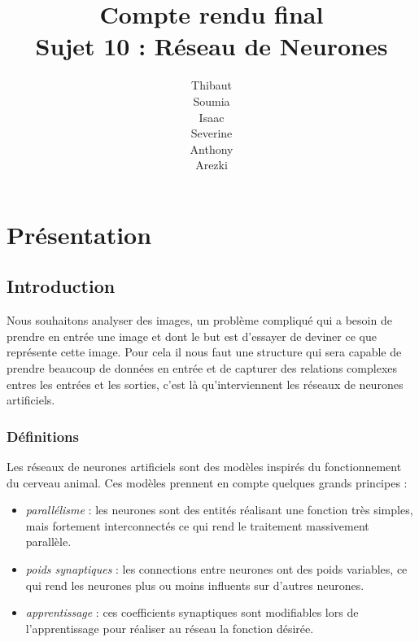 \documentclass{article}
\begin{document}
\newpage
\title{Compte rendu final\\Sujet 10 : Réseau de Neurones}
\author{Thibaut \\Soumia {}\\Isaac {}\\Severine {}\\Anthony {}\\Arezki {}}
\maketitle

\newpage

\small{\tableofcontents}
\newpage

\section{Présentation}
	\subsection{Introduction}
			Nous souhaitons analyser des images, un problème compliqué qui a besoin de prendre en entrée une image et dont le but est d'essayer de deviner ce que représente cette image. Pour cela il nous faut une structure qui sera capable de prendre beaucoup de données en entrée et de capturer des relations complexes entres les entrées et les sorties, c'est là qu'interviennent les réseaux de neurones artificiels.
		\subsubsection{Définitions}
			Les réseaux de neurones artificiels sont des modèles inspirés du fonctionnement du cerveau animal. Ces modèles prennent en compte quelques grands principes :
			\begin{itemize}
				\item \emph{parallélisme} : les neurones sont des entités réalisant une fonction très simples, mais fortement interconnectés ce qui rend le traitement massivement parallèle.
				\item \emph{poids synaptiques} : les connections entre neurones ont des poids variables, ce qui rend les neurones plus ou moins influents sur d'autres neurones.
				\item \emph{apprentissage} : ces coefficients synaptiques sont modifiables lors de l'apprentissage pour réaliser au réseau la fonction désirée.
			\end{itemize}
\end{document}
